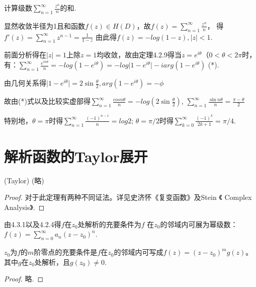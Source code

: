 \begin{eg}
	\color{blue}计算级数$\displaystyle{\sum_{n=1}^{\infty} \frac{z^n}{n}}$的和.
	
	\color{black}
	显然收敛半径为1且和函数$\displaystyle{f(z) \in H(D)}$，故$\displaystyle{f(z)=\sum_{n=1}^{\infty} \frac{z^n}{n}}$， 得$\displaystyle{f'(z)=\sum_{n=1}^{\infty} z^{n-1} = \frac{1}{1-z}}$
	由此得$\displaystyle{f(z)=-log(1-z), \vert z \vert < 1}$.
	
	前面分析得在$\displaystyle{\vert z \vert = 1}$上除$\displaystyle{z=1}$均收敛，故由定理4.2.9得当$\displaystyle{z=e^{i\theta} （0 < \theta < 2\pi}$时，有：$\displaystyle{\sum_{n=1}^{\infty} \frac{e^{in\theta}}{n} = -log(1-e^{i\theta})=-log \vert 1 - e^{i\theta} \vert - i arg(1 - e^{i\theta})}$ (*).
	
	由几何关系得$\displaystyle{\vert 1 - e ^{i\theta} \vert = 2 \sin \frac{\theta}{2}, arg(1 - e^{i\theta}) = - \phi}$ 
	
	故由(*)式以及比较实虚部得$\displaystyle{\sum_{n=1}^{\infty} \frac{cos n\theta}{n} = -log(2 \sin \frac{\theta}{2})}$, $\displaystyle{\sum_{n=1}^{\infty} \frac{\sin n\theta}{n} = \frac{\pi - \theta} {2}}$
	
	特别地，$\displaystyle{\theta = \pi}$时得$\displaystyle{\sum_{n=1}^{\infty} \frac{(-1)^{n-1}}{n} = log 2}$; $\displaystyle{\theta = \pi / 2}$时得$\displaystyle{\sum_{k=0}^{\infty} \frac{(-1)^k}{2k+1} = \pi / 4}$.
\end{eg}

\section{解析函数的{\rm Taylor}展开}
\begin{theorem}
	\color{blue}
	(\rm Taylor) \color{black} (略)
\end{theorem}

\begin{proof}
	对于此定理有两种不同证法。详见史济怀《复变函数》及Stein 《 Complex Analysis》.
\end{proof}

\begin{theorem}
	由4.3.1以及4.2.4得$\displaystyle{f}$在$\displaystyle{z_0}$处解析的充要条件为$\displaystyle{f}$ 在$\displaystyle{z_0}$的邻域内可展为幂级数：$\displaystyle{f(z)=\sum_{n=0}^{\infty}a_n (z-z_0)^n}$.
\end{theorem}

\begin{theorem}
	$\displaystyle{z_0}$为$\displaystyle{f}$的$\displaystyle{m}$阶零点的充要条件是$\displaystyle{f}$在$\displaystyle{z_0}$的邻域内可写成$\displaystyle{f(z)=(z-z_0)^m g(z)}$。其中$\displaystyle{g}$在$\displaystyle{z_0}$处解析，且$\displaystyle{g(z_0) \neq 0}$.
\end{theorem}
\begin{proof}
	略.
\end{proof}

